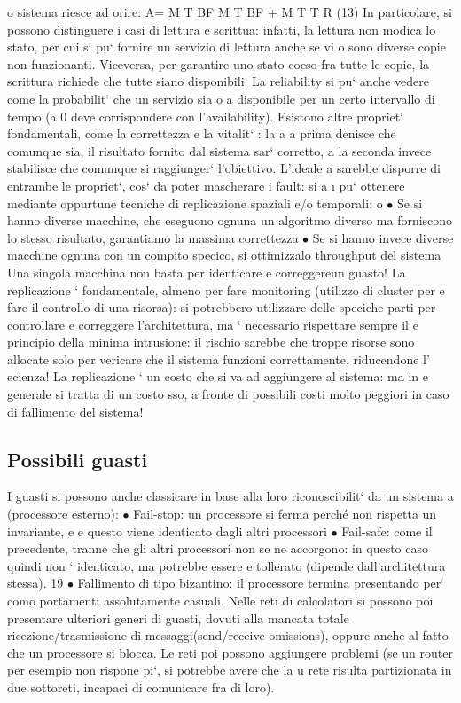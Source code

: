 \documentclass[a4paper,12pt]{article}
\begin{document}
o
sistema riesce ad orire:
A=
M T BF
M T BF + M T T R
(13)
In particolare, si possono distinguere i casi di lettura e scrittua: infatti, la lettura
non modica lo stato, per cui si pu` fornire un servizio di lettura anche se vi
o
sono diverse copie non funzionanti. Viceversa, per garantire uno stato coeso fra
tutte le copie, la scrittura richiede che tutte siano disponibili.
La reliability si pu` anche vedere come la probabilit` che un servizio sia
o
a
disponibile per un certo intervallo di tempo (a 0 deve corrispondere con l'availability).
Esistono altre propriet` fondamentali, come la correttezza e la vitalit` : la
a
a
prima denisce che comunque sia, il risultato fornito dal sistema sar` corretto,
a
la seconda invece stabilisce che comunque si raggiunger` l'obiettivo. L'ideale
a
sarebbe disporre di entrambe le propriet`, cos` da poter mascherare i fault: si
a
\i{}
pu` ottenere mediante oppurtune tecniche di replicazione spaziali e/o temporali:
o
$\bullet$ Se si hanno diverse macchine, che eseguono ognuna un algoritmo diverso
ma forniscono lo stesso risultato, garantiamo la massima correttezza
$\bullet$ Se si hanno invece diverse macchine ognuna con un compito specico, si
ottimizzalo throughput del sistema
Una singola macchina non basta per identicare e correggereun guasto! La
replicazione ` fondamentale, almeno per fare monitoring (utilizzo di cluster per
e
fare il controllo di una risorsa): si potrebbero utilizzare delle speciche parti
per controllare e correggere l'architettura, ma ` necessario rispettare sempre il
e
principio della minima intrusione: il rischio sarebbe che troppe risorse sono
allocate solo per vericare che il sistema funzioni correttamente, riducendone l'
ecienza! La replicazione ` un costo che si va ad aggiungere al sistema: ma in
e
generale si tratta di un costo sso, a fronte di possibili costi molto peggiori in
caso di fallimento del sistema!
\subsection{Possibili guasti}
I guasti si possono anche classicare in base alla loro riconoscibilit` da un sistema
a
(processore esterno):
$\bullet$ Fail-stop: un processore si ferma perché non rispetta un invariante, e
e
questo viene identicato dagli altri processori
$\bullet$ Fail-safe: come il precedente, tranne che gli altri processori non se ne
accorgono: in questo caso quindi non ` identicato, ma potrebbe essere
e
tollerato (dipende dall'architettura stessa).
19
$\bullet$ Fallimento di tipo bizantino: il processore termina presentando per` como
portamenti assolutamente casuali.
Nelle reti di calcolatori si possono poi presentare ulteriori generi di guasti, dovuti
alla mancata totale ricezione/trasmissione di messaggi(send/receive omissions),
oppure anche al fatto che un processore si blocca. Le reti poi possono aggiungere
problemi (se un router per esempio non rispone pi`, si potrebbe avere che la
u
rete risulta partizionata in due sottoreti, incapaci di comunicare fra di loro).
\end{document}
